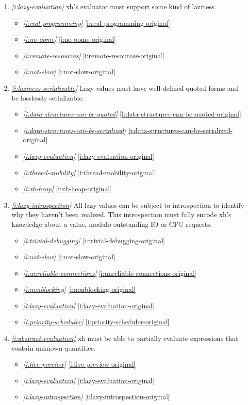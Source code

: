 \documentclass{report}
\makeatletter
\newcommand*{\Label}[2]{%
  \@bsphack
  \begingroup
    \label{#1-original}%
    \def\@currentlabel{#2}%
    \label{#1}%
  \endgroup
  \@esphack
}
\newcommand{\refboth}[1]{{\em \ref{#1}} \ref{#1-original}}
\makeatother
\begin{document}
\begin{enumerate}
\item{}\Label{i:lazy-evaluation}{lazy}{\em\ref{i:lazy-evaluation}}
  xh's evaluator must support some kind of laziness.
\begin{itemize}
\item \refboth{i:real-programming}
\item \refboth{i:no-oome}
\item \refboth{i:remote-resources}
\item \refboth{i:not-slow}
\end{itemize}
\item{}\Label{i:laziness-serializable}{printlazy}{\em\ref{i:laziness-serializable}}
  Lazy values must have well-defined quoted forms and be losslessly
  serializable.
\begin{itemize}
\item \refboth{i:data-structures-can-be-quoted}
\item \refboth{i:data-structures-can-be-serialized}
\item \refboth{i:lazy-evaluation}
\item \refboth{i:thread-mobility}
\item \refboth{i:xh-heap}
\end{itemize}
\item{}\Label{i:lazy-introspection}{introspectlazy}{\em\ref{i:lazy-introspection}}
  All lazy values can be subject to introspection to identify why they
  haven't been realized. This introspection must fully encode xh's
  knowledge about a value, modulo outstanding IO or CPU requests.
\begin{itemize}
\item \refboth{i:trivial-debugging}
\item \refboth{i:not-slow}
\item \refboth{i:unreliable-connections}
\item \refboth{i:nonblocking}
\item \refboth{i:lazy-evaluation}
\item \refboth{i:priority-scheduler}
\end{itemize}
\item{}\Label{i:abstract-evaluation}{abstract}{\em\ref{i:abstract-evaluation}}
  xh must be able to partially evaluate expressions that contain unknown
  quantities.
\begin{itemize}
\item \refboth{i:live-preview}
\item \refboth{i:lazy-evaluation}
\item \refboth{i:lazy-introspection}

\end{itemize}
\end{enumerate}
\end{document}

